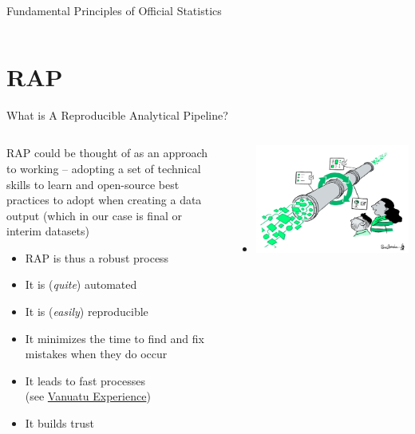 \documentclass[xcolor=x11names,compress]{beamer}
\renewcommand{\(}{\begin{columns}}
\renewcommand{\)}{\end{columns}}
\newcommand{\<}[1]{\begin{column}{#1}}
\renewcommand{\>}{\end{column}}
\begin{document}
\begin{frame}{Fundamental Principles of Official Statistics}
\begin{columns}[T]
\begin{column}{0.4\textwidth}
    \end{column}
  \end{columns}
\end{frame}

\section{RAP}  %

\begin{frame}{What is A Reproducible Analytical Pipeline?}
  \begin{columns}[T]
    \begin{column}{0.5\textwidth}
      RAP could be thought of as an approach to working -- adopting a set of technical skills to learn and open-source best practices to adopt when creating a data output (which in our case is final or interim datasets)
      \begin{itemize}[<+->]
        \item RAP is thus a robust process
        \item It is (\emph{quite}) automated
        \item It is (\emph{easily}) reproducible
        \item It minimizes the time to find and fix mistakes when they do occur
        \item It leads to fast processes\\ (see \href{https://github.com/Vanuatu-National-Statistics-Office/vnso-RAP-marketStats-materials}{Vanuatu Experience})
        \item It builds trust
      \end{itemize}
    \end{column}
    \begin{column}{0.5\textwidth}
    \begin{itemize}
        \item[] \includegraphics[width=1.0\textwidth]{ReusablePipeline.png}
    \end{itemize}
    \end{column}
  \end{columns}
\end{frame}
\end{document}
